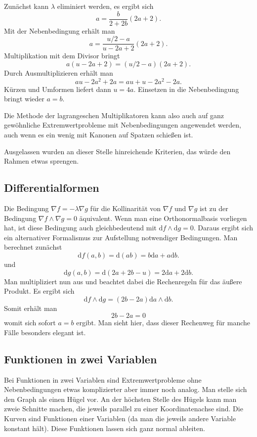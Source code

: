 \documentclass[a4paper,11pt,fleqn,twocolumn]{article}
\begin{document}
Zunächst kann \(\lambda\) eliminiert werden, es ergibt sich
\[a=\frac{b}{2+2b}(2a+2).\]
Mit der Nebenbedingung erhält man
\[a=\frac{u/2-a}{u-2a+2}(2a+2).\]
Multiplikation mit dem Divisor bringt
\[a(u-2a+2)=(u/2-a)(2a+2).\]
Durch Ausmultiplizieren erhält man
\[au-2a^2+2a = au+u-2a^2-2a.\]
Kürzen und Umformen liefert dann \(u=4a\). Einsetzen
in die Nebenbedingung bringt wieder \(a=b\).

Die Methode der lagrangeschen Multiplikatoren kann also auch auf
ganz gewöhnliche Extremwertprobleme mit Nebenbedingungen angewendet
werden, auch wenn es ein wenig mit Kanonen auf Spatzen schießen ist.

Ausgelassen wurden an dieser Stelle hinreichende Kriterien,
das würde den Rahmen etwas sprengen.

\subsection*{Differentialformen}

Die Bedingung \(\nabla f=-\lambda\nabla g\) für die Kollinarität von \(\nabla f\) und \(\nabla g\) ist zu der Bedingung \(\nabla f\wedge\nabla g=0\) äquivalent. Wenn man eine Orthonormalbasis vorliegen hat, ist diese Bedingung auch gleichbedeutend mit \(\mathrm df\wedge\mathrm dg=0\).
Daraus ergibt sich ein alternativer Formalismus
zur Aufstellung notwendiger Bedingungen. Man berechnet zunächst
\[\mathrm df(a,b) = \mathrm d(ab) = b\mathrm da+a\mathrm db.\]
und
\[\mathrm dg(a,b) = \mathrm d(2a+2b-u) = 2\mathrm da+2\mathrm db.\]
Man multipliziert nun aus und beachtet dabei die Rechenregeln
für das äußere Produkt. Es ergibt sich
\[\mathrm df\wedge\mathrm dg
= (2b-2a)\mathrm da\wedge\mathrm db.\]
Somit erhält man
\[2b-2a=0\]
womit sich sofort \(a=b\) ergibt. Man sieht hier, dass dieser Rechenweg für manche Fälle besonders elegant ist.

\subsection*{Funktionen in zwei Variablen}

Bei Funktionen in zwei Variablen sind Extremwertprobleme ohne
Nebenbedingungen etwas komplizierter aber immer noch analog.
Man stelle sich den Graph
als einen Hügel vor. An der höchsten Stelle des Hügels kann man
zweie Schnitte machen, die jeweils parallel zu einer Koordinatenachse
sind. Die Kurven sind Funktionen einer Variablen (da man
die jeweils andere Variable konstant hält). Diese Funktionen lassen
sich ganz normal ableiten.
\end{document}
